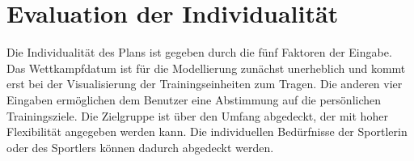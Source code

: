 \section{Evaluation der Individualität}
Die Individualität des Plans ist gegeben durch die fünf Faktoren der Eingabe. Das Wettkampfdatum ist für die Modellierung zunächst unerheblich und kommt erst bei der Visualisierung der Trainingseinheiten zum Tragen. Die anderen vier Eingaben ermöglichen dem Benutzer eine Abstimmung auf die persönlichen Trainingsziele. Die Zielgruppe ist über den Umfang abgedeckt, der mit hoher Flexibilität angegeben werden kann. Die individuellen Bedürfnisse der Sportlerin oder des Sportlers können dadurch abgedeckt werden.